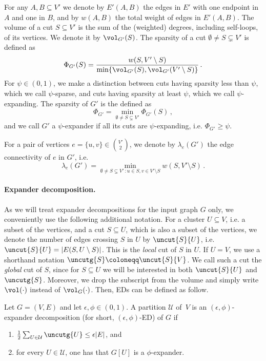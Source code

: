For any $A,B \subseteq V'$ we denote by $E'(A,B)$ the edges in $E'$ with one endpoint in $A$ and one in $B$, and by $w(A,B)$ the total weight of edges in $E'(A,B)$. The volume of a cut $S \subseteq V'$ is the sum of the (weighted) degrees, including self-loops, of its vertices. We denote it by $\vol_{G'}(S)$. The sparsity of a cut $\emptyset \neq S \subsetneq V'$ is defined as
\begin{equation*}
	\Phi_{G'}(S) = \frac{w(S,V' \setminus S)}{\min\{\vol_{G'}(S), \vol_{G'}(V' \setminus S)\}} \, .
\end{equation*}
For $\psi \in (0,1)$, we make a distinction between cuts having sparsity less than $\psi$, which we call $\psi$-sparse, and cuts having sparsity at least $\psi$, which we call $\psi$-expanding. The sparsity of $G'$ is the defined as
\begin{equation*}
	\Phi_{G'} = \min_{\emptyset \neq S \subsetneq V'} \Phi_{G'}(S) \, ,
\end{equation*}
and we call $G'$ a $\psi$-expander if all its cuts are $\psi$-expanding, i.e. $\Phi_{G'} \ge \psi$.

For a pair of vertices $e=\{u,v\} \in \binom{V'}{2}$, we denote by $\lambda_{e}(G')$ the edge connectivity of $e$ in $G'$, i.e.
\begin{equation*}
	\lambda_{e}(G') = \min_{\emptyset \neq S \subsetneq V'\, : u \in S, v \in V' \setminus S} w(S,V'\setminus S) \, .
\end{equation*}

\paragraph{Expander decomposition.} As we will treat expander decompositions for the input graph $G$ only, we conveniently use the following additional notation. For a cluster $U \subseteq V$, i.e. a subset of the vertices, and a cut $S \subseteq U$, which is also a subset of the vertices, we denote the number of edges crossing $S$ in $U$ by $\uncut{S}{U}$, i.e. $\uncut{S}{U}=|E(S,U \setminus S)|$. This is the \emph{local} cut of $S$ in $U$. If $U = V$, we use a shorthand notation $\uncutg{S} \coloneqq \uncut{S}{V}$. We call such a cut the \emph{global} cut of $S$, since for $S \subseteq U$ we will be interested in both $\uncut{S}{U}$ and $\uncutg{S}$. Moreover, we drop the subscript from the volume and simply write $\vol(\cdot)$ instead of $\vol_G(\cdot)$. Then, EDs can be defined as follow.

\begin{definition}
	\label{def:expdecclassic}
	Let $G=(V,E)$ and let $\epsilon, \phi \in (0,1)$. A partition $\mathcal{U}$ of~$V$ is an $(\epsilon, \phi)$-expander decomposition (for short, $(\epsilon, \phi)$-ED) of $G$ if
	\begin{enumerate}
		\item \label{property:crossingclassic} $\frac{1}{2}\sum_{U \in \mathcal{U}} \uncutg{U} \le \epsilon |E|$, and
		\item \label{property:expanderclassic} for every $U \in \mathcal{U}$, one has that $G[U]$ is a $\phi$-expander.
	\end{enumerate}
\end{definition}
